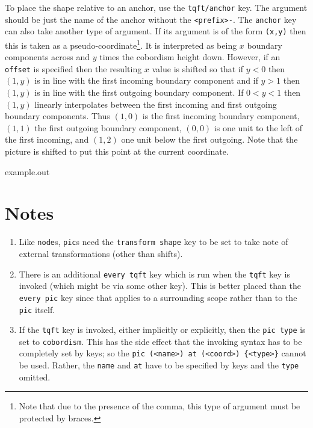 \documentclass{ltxdoc}
\newenvironment{example}
  {\VerbatimEnvironment
   \begin{VerbatimOut}{example.out}}
  {\end{VerbatimOut}
   \begin{center}
   \setlength{\parindent}{0pt}
   \fbox{\begin{minipage}{.9\linewidth}
     \lstset{breakatwhitespace=true,breaklines=true,language=TeX,basicstyle=\small}
     
   \end{minipage}}

   \fbox{\begin{minipage}{.9\linewidth}
     \centering
     
   \end{minipage}}
\end{center}
}
\begin{document}
To place the shape relative to an anchor, use the \Verb+tqft/anchor+ key.
The argument should be just the name of the anchor without the \Verb+<prefix>-+.
The \Verb+anchor+ key can also take another type of argument.
If its argument is of the form \Verb+(x,y)+ then this is taken as a pseudo-coordinate\footnote{Note that due to the presence of the comma, this type of argument must be protected by braces.}.
It is interpreted as being \(x\) boundary components across and \(y\) times the cobordism height down.
However, if an \Verb+offset+ is specified then the resulting \(x\) value is shifted so that if \(y < 0\) then \((1,y)\) is in line with the first incoming boundary component and if \(y > 1\) then \((1,y)\) is in line with the first outgoing boundary component.
If \(0 < y < 1\) then \((1,y)\) linearly interpolates between the first incoming and first outgoing boundary components.
Thus \((1,0)\) is the first incoming boundary component, \((1,1)\) the first outgoing boundary component, \((0,0)\) is one unit to the left of the first incoming, and \((1,2)\) one unit below the first outgoing.
Note that the picture is shifted to put this point at the current coordinate.

\begin{example}
\end{example}

\section{Notes}

\begin{enumerate}
\item Like \Verb+node+s, \Verb+pic+s need the \Verb+transform shape+ key to be set to take note of external transformations (other than shifts).
\item There is an additional \Verb+every tqft+ key which is run when the \Verb+tqft+ key is invoked (which might be via some other key).
This is better placed than the \Verb+every pic+ key since that applies to a surrounding scope rather than to the \Verb+pic+ itself.
\item If the \Verb+tqft+ key is invoked, either implicitly or explicitly, then the \Verb+pic type+ is set to \Verb+cobordism+.
This has the side effect that the invoking syntax has to be completely set by keys; so the \Verb+pic (<name>) at (<coord>) {<type>}+ cannot be used.
Rather, the \Verb+name+ and \Verb+at+ have to be specified by keys and the \Verb+type+ omitted.
\end{enumerate}
\end{document}

